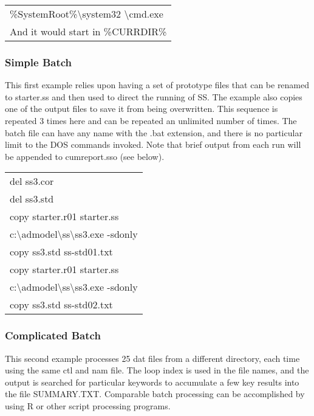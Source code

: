 \begin{center}
	\begin{longtable}{p{13cm}}
		\%SystemRoot\%\textbackslash system32 \textbackslash cmd.exe\\
		And it would start in \%CURRDIR\%\\
	\end{longtable}
\end{center}

\subsubsection{Simple Batch}
This first example relies upon having a set of prototype files that can be renamed to starter.ss and then used to direct the running of SS.  The example also copies one of the output files to save it from being overwritten.  This sequence is repeated 3 times here and can be repeated an unlimited number of times.  The batch file can have any name with the .bat extension, and there is no particular limit to the DOS commands invoked.  Note that brief output from each run will be appended to cumreport.sso (see below).

\begin{center}
	\begin{longtable}{p{13cm}}
		del ss3.cor\\
		del ss3.std\\
		copy starter.r01 starter.ss\\
		c:\textbackslash admodel\textbackslash ss\textbackslash ss3.exe -sdonly\\
		copy ss3.std ss-std01.txt\\
		copy starter.r01 starter.ss\\
		c:\textbackslash admodel\textbackslash ss\textbackslash ss3.exe -sdonly\\
		copy ss3.std ss-std02.txt\\
	\end{longtable}
\end{center}

\subsubsection{Complicated Batch}
This second example processes 25 dat files from a different directory, each time using the same ctl and nam file.  The loop index is used in the file names, and the output is searched for particular keywords to accumulate a few key results into the file SUMMARY.TXT.  Comparable batch processing can be accomplished by using R or other script processing programs.

